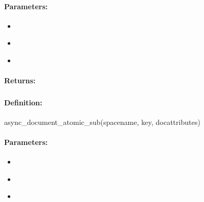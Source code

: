 \paragraph{Parameters:}
\begin{itemize}[noitemsep]
\item {}\\

\item {}\\

\item {}\\

\end{itemize}

\paragraph{Returns:}


\pagebreak
\subsubsection{}
\label{api:ruby:async_document_atomic_sub}


\paragraph{Definition:}
\begin{rubycode}
async_document_atomic_sub(spacename, key, docattributes)
\end{rubycode}

\paragraph{Parameters:}
\begin{itemize}[noitemsep]
\item {}\\

\item {}\\

\item {}\\

\end{itemize}

